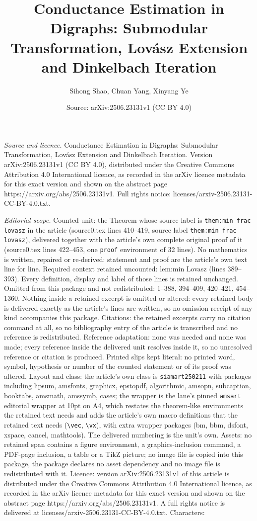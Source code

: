\documentclass[10pt,a4paper]{amsart}
\title[Conductance Estimation in Digraphs: Submodular Transformatio]{Conductance Estimation in Digraphs: Submodular Transformation, Lov\'asz Extension and Dinkelbach Iteration}
\author{Sihong Shao, Chuan Yang, Xinyang Ye}
\date{Source: arXiv:2506.23131v1 (CC BY 4.0)}
\begin{document}
\maketitle

\noindent\emph{Source and licence.} Conductance Estimation in Digraphs: Submodular Transformation, Lov\'asz Extension and Dinkelbach Iteration. Version arXiv:2506.23131v1 (CC BY 4.0), distributed under the Creative Commons Attribution 4.0 International licence, as recorded in the arXiv licence metadata for this exact version and shown on the abstract page https://arxiv.org/abs/2506.23131v1. Full rights notice: licenses/arxiv-2506.23131-CC-BY-4.0.txt.\par\smallskip

\noindent\textit{Editorial scope.} Counted unit: the Theorem whose source label is \texttt{them:min frac lovasz} in the article (source0.tex lines 410--419, source label \texttt{them:min frac lovasz}), delivered together with the article's own complete original proof of it (source0.tex lines 422--453, one \texttt{proof} environment of 32 lines). No mathematics is written, repaired or re-derived: statement and proof are the article's own text line for line. Required context retained uncounted: lem:min Lovasz (lines 389--393). Every definition, display and label of those lines is retained unchanged. Omitted from this package and not redistributed: 1--388, 394--409, 420--421, 454--1360. Nothing inside a retained excerpt is omitted or altered: every retained body is delivered exactly as the article's lines are written, so no omission receipt of any kind accompanies this package. Citations: the retained excerpts carry no citation command at all, so no bibliography entry of the article is transcribed and no reference is redistributed. Reference adaptation: none was needed and none was made; every reference inside the delivered unit resolves inside it, so no unresolved reference or citation is produced. Printed slips kept literal: no printed word, symbol, hypothesis or number of the counted statement or of its proof was altered. Layout and class: the article's own class is \texttt{siamart250211} with packages including lipsum, amsfonts, graphicx, epstopdf, algorithmic, amsopn, subcaption, booktabs, amsmath, amssymb, cases; the wrapper is the lane's pinned \texttt{amsart} editorial wrapper at 10pt on A4, which restates the theorem-like environments the retained text needs and adds the article's own macro definitions that the retained text needs (\texttt{\textbackslash vec}, \texttt{\textbackslash vx}), with extra wrapper packages (bm, bbm, dsfont, xspace, cancel, mathtools). The delivered numbering is the unit's own. Assets: no retained span contains a figure environment, a graphics-inclusion command, a PDF-page inclusion, a table or a TikZ picture; no image file is copied into this package, the package declares no asset dependency and no image file is redistributed with it. Licence: version arXiv:2506.23131v1 of this article is distributed under the Creative Commons Attribution 4.0 International licence, as recorded in the arXiv licence metadata for this exact version and shown on the abstract page https://arxiv.org/abs/2506.23131v1. A full rights notice is delivered at licenses/arxiv-2506.23131-CC-BY-4.0.txt. Characters: 
\end{document}
